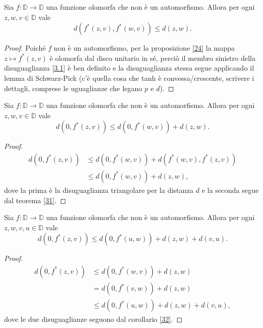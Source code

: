 \begin{thm} \label{31}
  Sia $f:\mathbb{D} \longrightarrow \mathbb{D}$ una funzione olomorfa che non è un automorfismo. Allora per ogni $z, w, v \in \mathbb{D}$ vale
  \begin{equation} \label{3.1}
    d(f^*(z,v),f^*(w,v)) \le d(z,w).
  \end{equation}
\end{thm}


\begin{proof}
  Poiché $f$ non è un automorfismo, per la proposizione \ref{24} la mappa $z \longmapsto f^*(z,v)$ è olomorfa dal disco unitario in sé, perciò il membro sinistro della disuguaglianza \eqref{3.1} è ben definito e la disuguaglianza stessa segue applicando il lemma di Schwarz-Pick (c'è quella cosa che tanh è convessa/crescente, scrivere i dettagli, comprese le uguaglianze che legano $p$ e $d$).
\end{proof}

\begin{cor} \label{32}
  Sia $f:\mathbb{D} \longrightarrow \mathbb{D}$ una funzione olomorfa che non è un automorfismo. Allora per ogni $z, w, v \in \mathbb{D}$ vale
  \begin{equation}
    d(0, f^*(z,v)) \le d(0,f^*(w,v))+d(z,w).
  \end{equation}
\end{cor}

\begin{proof}
  \begin{align*}
    d(0,f^*(z,v)) & \le d(0,f^*(w,v))+d(f^*(w,v),f^*(z,v)) \\
    & \le d(0,f^*(w,v))+d(z,w),
  \end{align*}
  dove la prima è la disuguaglianza triangolare per la distanza $d$ e la seconda segue dal teorema \ref{31}.
\end{proof}

\begin{cor} \label{33}
  Sia $f:\mathbb{D} \longrightarrow \mathbb{D}$ una funzione olomorfa che non è un automorfismo. Allora per ogni $z, w, v, u \in \mathbb{D}$ vale
  \begin{equation}
    d(0, f^*(z,v)) \le d(0, f^*(u,w))+d(z,w)+d(v,u).
  \end{equation}
\end{cor}

\begin{proof}
  \begin{align*}
    d(0,f^*(z,v)) & \le d(0,f^*(w,v))+d(z,w) \\
    & =d(0,f^*(v,w))+d(z,w) \\
    & \le d(0,f^*(u,w))+d(z,w)+d(v,u),
  \end{align*}
  dove le due disuguaglianze seguono dal corollario \ref{32}.
\end{proof}

